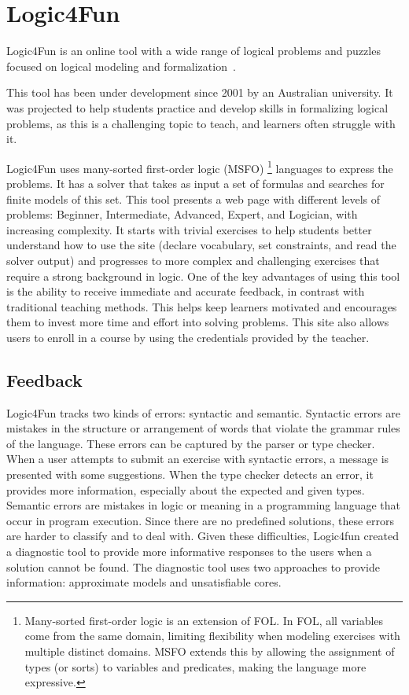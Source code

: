 \section{Logic4Fun}

Logic4Fun is an online tool with a wide range of logical problems and puzzles focused on logical modeling and formalization~\cite{slaney_logic}.

This tool has been under development since 2001 by an Australian university. It was projected to help students practice and develop skills in formalizing logical problems, as this is a challenging topic to teach, and learners often struggle with it.

Logic4Fun uses many-sorted first-order logic (MSFO) \footnote{Many-sorted first-order logic is an extension of \gls{FOL}. In \gls{FOL}, all variables come from the same domain, limiting flexibility when modeling exercises with multiple distinct domains. MSFO extends this by allowing the assignment of types (or sorts) to variables and predicates, making the language more expressive.} languages to express the problems. It has a solver that takes as input a set of formulas and searches for finite models of this set. This tool presents a web page with different levels of problems: Beginner, Intermediate, Advanced, Expert, and Logician, with increasing complexity. It starts with trivial exercises to help students better understand how to use the site (declare vocabulary, set constraints, and read the solver output) and progresses to more complex and challenging exercises that require a strong background in logic. One of the key advantages of using this tool is the ability to receive immediate and accurate feedback, in contrast with traditional teaching methods. This helps keep learners motivated and encourages them to invest more time and effort into solving problems. This site also allows users to enroll in a course by using the credentials provided by the teacher.

\subsection{Feedback}

Logic4Fun tracks two kinds of errors: syntactic and semantic. Syntactic errors are mistakes in the structure or arrangement of words that violate the grammar rules of the language. These errors can be captured by the parser or type checker. When a user attempts to submit an exercise with syntactic errors, a message is presented with some suggestions. When the type checker detects an error, it provides more information, especially about the expected and given types. Semantic errors are mistakes in logic or meaning in a programming language that occur in program execution. Since there are no predefined solutions, these errors are harder to classify and to deal with. Given these difficulties, Logic4fun created a diagnostic tool to provide more informative responses to the users when a solution cannot be found. The diagnostic tool uses two approaches to provide information: approximate models and unsatisfiable cores.


